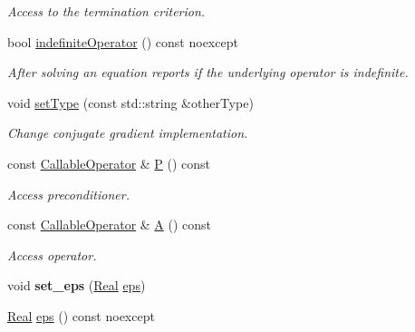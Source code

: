 \begin{DoxyCompactItemize}
\begin{DoxyCompactList}\small\item\em Access to the termination criterion. \end{DoxyCompactList}\item 
bool \hyperlink{classSpacy_1_1CG_1_1Solver_ae0b6c7b754e093610df6d67bf3067acf}{indefinite\-Operator} () const noexcept
\begin{DoxyCompactList}\small\item\em After solving an equation reports if the underlying operator is indefinite. \end{DoxyCompactList}\item 
void \hyperlink{classSpacy_1_1CG_1_1Solver_a4009b5e2062e4930f0cfdc9d979c7b80}{set\-Type} (const std\-::string \&other\-Type)
\begin{DoxyCompactList}\small\item\em Change conjugate gradient implementation. \end{DoxyCompactList}\item 
const \hyperlink{namespaceSpacy_a022a87afa759e18781dd2aea9a80cd73}{Callable\-Operator} \& \hyperlink{classSpacy_1_1CG_1_1Solver_a929d2b9deecfd96ef7efb8097e567f37}{P} () const 
\begin{DoxyCompactList}\small\item\em Access preconditioner. \end{DoxyCompactList}\item 
const \hyperlink{namespaceSpacy_a022a87afa759e18781dd2aea9a80cd73}{Callable\-Operator} \& \hyperlink{classSpacy_1_1CG_1_1Solver_a9b0fa76350c42fb60b2fbeb40b343fa2}{A} () const 
\begin{DoxyCompactList}\small\item\em Access operator. \end{DoxyCompactList}\item 
\hypertarget{classSpacy_1_1Mixin_1_1Eps_a818ab6dfab5e4eea583e1302bcc621f8}{void {\bfseries set\-\_\-eps} (\hyperlink{classSpacy_1_1Real}{Real} \hyperlink{classSpacy_1_1Mixin_1_1Eps_a812b99b0abc1d78a34b4114907f23f52}{eps})}\label{classSpacy_1_1Mixin_1_1Eps_a818ab6dfab5e4eea583e1302bcc621f8}

\item 
\hypertarget{classSpacy_1_1Mixin_1_1Eps_a812b99b0abc1d78a34b4114907f23f52}{\hyperlink{classSpacy_1_1Real}{Real} \hyperlink{classSpacy_1_1Mixin_1_1Eps_a812b99b0abc1d78a34b4114907f23f52}{eps} () const noexcept}\label{classSpacy_1_1Mixin_1_1Eps_a812b99b0abc1d78a34b4114907f23f52}


\end{DoxyCompactItemize}
